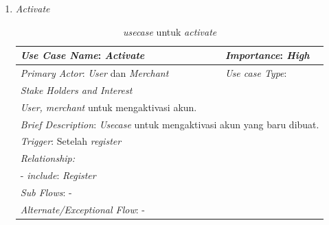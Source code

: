 \documentclass[a4paper]{article}
\begin{document}
\begin{enumerate}
\begin{enumerate}
        \item \textit{Activate}
            \begin{table}[h]
                \centering
                \begin{tabular}{|lll}
                \hline
                \multicolumn{1}{|l|}{\textit{Use Case Name}: \textit{Activate}}             & \multicolumn{2}{l|}{\textit{Importance}: \textit{High}}   \\ \hline
                \multicolumn{1}{|l|}{\textit{Primary Actor}: \textit{User} dan \textit{Merchant}}             & \multicolumn{2}{l|}{\textit{Use case Type}:} \\ \hline
                \multicolumn{1}{|l|}{\textit{Stake Holders and Interest}} &                               &                               \\ \cline{1-1}
                \multicolumn{1}{|l|}{\textit{User, merchant}  untuk mengaktivasi akun.}                                                     &                               &                               \\ \hline
                \multicolumn{3}{|l|}{\textit{Brief Description}: \textit{Usecase} untuk mengaktivasi akun yang baru dibuat.}                                                                         \\ \hline
                \multicolumn{3}{|l|}{\textit{Trigger}: Setelah \textit{register}}                                                                                   \\ \hline
                \multicolumn{3}{|l|}{\textit{Relationship:}}                                                                              \\ \hline
                \multicolumn{3}{|l|}{- \textit{include}: \textit{Register}}                                                                                                                     \\ \hline
                \multicolumn{3}{|l|}{\textit{Sub Flows}: -}                                                                                 \\ \hline
                \multicolumn{3}{|l|}{\textit{Alternate/Exceptional Flow}: -}                                                                \\ \hline
                \end{tabular}
                \caption{\textit{usecase} untuk \textit{activate}}
            \end{table}


\end{enumerate}
\end{enumerate}
\end{document}
